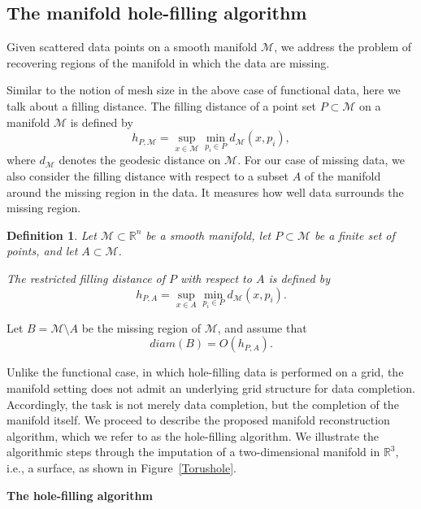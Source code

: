 \documentclass[11pt,oneside,reqno]{amsart}
\theoremstyle{plain}
\newtheorem{definition}[theorem]{Definition}
\numberwithin{equation}{section}
\begin{document}
\subsection{The manifold hole-filling algorithm}\hfill

Given scattered data points on a smooth manifold $\mathcal{M}$,
we address the problem of recovering
regions of the manifold in which the data are missing.

Similar to the notion of mesh size in the above case of functional data, here we talk about a filling distance. 
The filling distance of a point set $P\subset\mathcal{M}$
on a manifold $\mathcal{M}$ is defined by
\[
h_{P,\mathcal{M}}
=
\sup_{x\in\mathcal{M}}
\min_{p_i\in P} d_{\mathcal{M}}(x,p_i),
\]
where $d_{\mathcal{M}}$ denotes the geodesic distance on $\mathcal{M}$. For our case of missing data, we also consider the filling distance with respect to a subset $A$ of the manifold around the missing region in the data.
It measures how well data surrounds the missing region.

\begin{definition}
Let $\mathcal{M}\subset\mathbb{R}^n$ be a smooth manifold,
let $P\subset\mathcal{M}$ be a finite set of points,
and let $A\subset\mathcal{M}$.

The restricted filling distance of $P$ with respect to $A$
is defined by
\[
h_{P,A}
=
\sup_{x\in A}
\min_{p_i\in P}
d_{\mathcal{M}}(x,p_i).
\]
\end{definition}

Let $B=\mathcal{M}\setminus A$ be the missing region of $\mathcal{M}$, and assume that
\begin{equation}\label{OhPA}
diam(B)= O(h_{P,A}).
\end{equation}

Unlike the functional case,
in which hole-filling data is performed on a grid,
the manifold setting does not admit
an underlying grid structure for data completion. Accordingly, the task is not merely data completion,
but the completion of the manifold itself. We proceed to describe the proposed manifold reconstruction algorithm,
which we refer to as the hole-filling algorithm. We illustrate the algorithmic steps 
through the imputation 
of a two-dimensional manifold 
in $\mathbb{R}^3$, 
i.e., a surface, 
as shown in Figure~\ref{Torushole}.

\medskip
{\bf The hole-filling algorithm}
\end{document}
